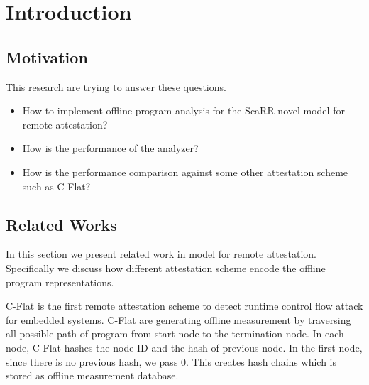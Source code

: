
\chapter{Introduction} %

\label{Chapter1} %


\section{Motivation}


This research are trying to answer these questions.
\begin{itemize}
    \item How to implement offline program analysis for the ScaRR novel model for remote attestation?
    \item How is the performance of the analyzer?
    \item How is the performance comparison against some other attestation scheme such as C-Flat?
\end{itemize}

\section{Related Works}


In this section we present related work in model for remote attestation. Specifically we discuss how different attestation scheme encode the offline program representations.

C-Flat \cite{aberaCFLATControlFlowAttestation2016} is the first remote attestation scheme to detect runtime control flow attack for embedded systems. C-Flat are generating offline measurement by traversing all possible path of program from start node to the termination node. In each node, C-Flat hashes the node ID and the hash of previous node. In the first node, since there is no previous hash, we pass 0. This creates hash chains which is stored as offline measurement database.

